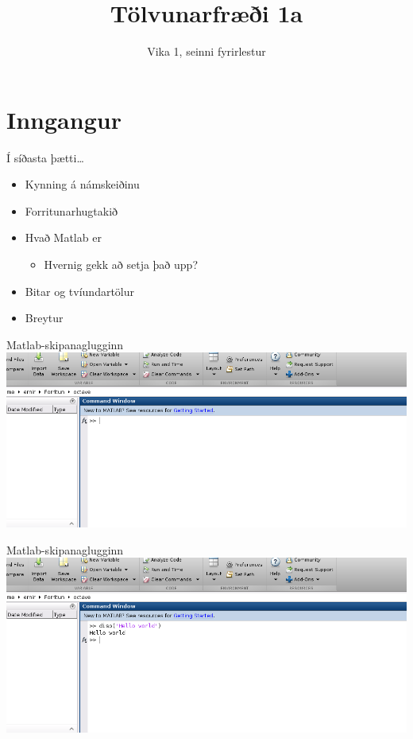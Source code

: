 \documentclass[handout]{beamer}
\title{Tölvunarfræði 1a}
\subtitle{Vika 1, seinni fyrirlestur}
\begin{document}
\begin{frame}
\titlepage
\end{frame}

\section{Inngangur}

\begin{frame}{Í síðasta þætti\ldots}
\begin{itemize}
 \item Kynning á námskeiðinu
 \item Forritunarhugtakið
 \item Hvað Matlab er
 \begin{itemize}
  \item Hvernig gekk að setja það upp?
 \end{itemize}
 \item Bitar og tvíundartölur
 \item Breytur
\end{itemize}
\end{frame}

\begin{frame}{Matlab-skipanaglugginn}
\includegraphics[width=\textwidth]{Pics/command-window}
\end{frame}

\begin{frame}{Matlab-skipanaglugginn}
\includegraphics[width=\textwidth]{Pics/command-window-hello-world}
\end{frame}
\end{document}
